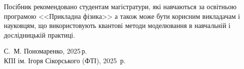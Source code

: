 {\begin{alwayssingle}
        Посібник рекомендовано студентам магістратури, які навчаються за освітньою програмою  <<Прикладна фізика>> а також може бути корисним викладачам і науковцям, що використовують квантові методи моделювання в навчальній і дослідницькій практиці.

		\vfill

	\hfill
	\begin{minipage}[t]{0.55\linewidth}\small
        \textcopyright{} С.~М. Пономаренко, 2025\,р. \\
        \textcopyright{}  КПІ ім. Ігоря Сікорського (ФТІ), 2025~р.
    \end{minipage}
		\newpage%
	\end{alwayssingle}
}

